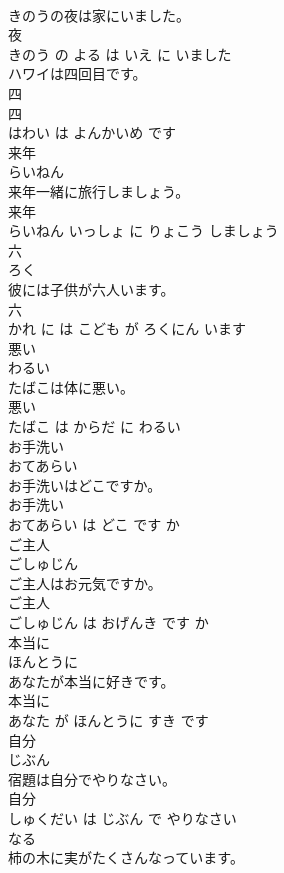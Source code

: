 \documentclass[8pt]{extreport}
\begin{document}
\begin{CJK}{UTF8}{min}
\\	きのうの夜は家にいました。	
\\	夜 
\\	きのう の よる は いえ に いました			
\\	ハワイは四回目です。	
\\	四 
\\	四 
\\	はわい は よんかいめ です			
\\	来年	
\\	らいねん			
\\	来年一緒に旅行しましょう。	
\\	来年 
\\	らいねん いっしょ に りょこう しましょう			
\\	六	
\\	ろく			
\\	彼には子供が六人います。	
\\	六 
\\	かれ に は こども が ろくにん います			
\\	悪い	
\\	わるい			
\\	たばこは体に悪い。	
\\	悪い 
\\	たばこ は からだ に わるい			
\\	お手洗い	
\\	おてあらい			
\\	お手洗いはどこですか。	
\\	お手洗い 
\\	おてあらい は どこ です か			
\\	ご主人	
\\	ごしゅじん			
\\	ご主人はお元気ですか。	
\\	ご主人 
\\	ごしゅじん は おげんき です か			
\\	本当に	
\\	ほんとうに			
\\	あなたが本当に好きです。	
\\	本当に 
\\	あなた が ほんとうに すき です			
\\	自分	
\\	じぶん			
\\	宿題は自分でやりなさい。	
\\	自分 
\\	しゅくだい は じぶん で やりなさい			
\\	なる	
\\	柿の木に実がたくさんなっています。	

\end{CJK}
\end{document}
